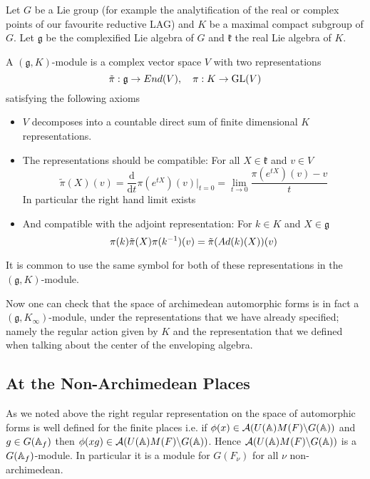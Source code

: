 \begin{definition}
    Let \(G\) be a Lie group (for example the analytification of the real or complex points of our favourite reductive LAG) and \(K\) be a maximal compact subgroup of \(G\). Let \(\mathfrak{g}\) be the complexified Lie algebra of \(G\) and \(\mathfrak{k}\) the real Lie algebra of \(K\). 
    
    A \((\mathfrak{g}, K)\)-module is a complex vector space \(V\) with two representations 
    \[\tilde{\pi}: \mathfrak{g} \to End(V), \quad \pi: K\to \operatorname{GL}(V)\]
    satisfying the following axioms
    \begin{itemize}
        \item \(V\) decomposes into a countable direct sum of finite dimensional \(K\) representations.
        \item The representations should be compatible: For all \(X \in \mathfrak{k}\) and \(v\in V\)
        \[\tilde{\pi}(X)(v) = \frac{\mathrm{d}}{\mathrm{d}t}\pi(e^{tX})(v)|_{t=0} = \lim_{t\to 0}\frac{\pi(e^{tX})(v) - v}{t}\]
        In particular the right hand limit exists
        \item And compatible with the adjoint representation: For \(k\in K\) and \(X\in \mathfrak{g}\) 
         \[\pi(k)\tilde{\pi}(X) \pi(k^{-1} )(v) = \tilde{\pi}(Ad(k)(X))(v)\]
    \end{itemize}
\end{definition}

\begin{remark}
    It is common to use the same symbol for both of these representations in the \((\mathfrak{g}, K)\)-module.
\end{remark}
Now one can check  that the space of archimedean automorphic forms is in fact a \((\mathfrak{g}, K_\infty)\)-module, under the representations that we have already specified; namely the regular action given by \(K\) and the representation that we defined when talking about the center of the enveloping algebra.

\subsection{At the Non-Archimedean Places}
As we noted above the right regular representation on the space of automorphic forms is well defined for the finite places i.e. 
if \(\phi(x)\in \mathcal{A}(U(\A)M(F)\backslash G(\A))\) and \(g\in G(\A_f)\) then \(\phi(xg) \in \mathcal{A}(U(\A)M(F)\backslash G(\A)) \). Hence \(\mathcal{A}(U(\A)M(F)\backslash G(\A))\) is a \(G(\A_f)\)-module. In particular it is a module for \(G(F_\nu)\) for all \(\nu\) non-archimedean.

